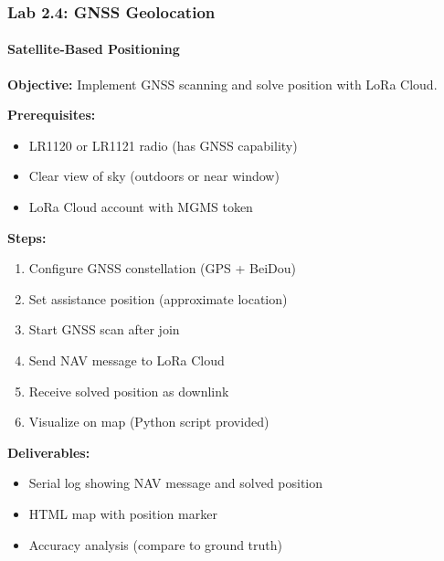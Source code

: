 \documentclass{beamer}
\begin{document}
\begin{frame}
\frametitle{Lab 2.4: GNSS Geolocation}
\framesubtitle{Satellite-Based Positioning}

\textbf{Objective:} Implement GNSS scanning and solve position with LoRa Cloud.

\textbf{Prerequisites:}
\begin{itemize}
    \item LR1120 or LR1121 radio (has GNSS capability)
    \item Clear view of sky (outdoors or near window)
    \item LoRa Cloud account with MGMS token
\end{itemize}

\textbf{Steps:}
\begin{enumerate}
    \item Configure GNSS constellation (GPS + BeiDou)
    \item Set assistance position (approximate location)
    \item Start GNSS scan after join
    \item Send NAV message to LoRa Cloud
    \item Receive solved position as downlink
    \item Visualize on map (Python script provided)
\end{enumerate}

\textbf{Deliverables:}
\begin{itemize}
    \item Serial log showing NAV message and solved position
    \item HTML map with position marker
    \item Accuracy analysis (compare to ground truth)
\end{itemize}
\end{frame}
\end{document}
